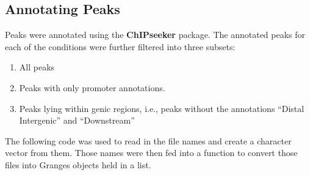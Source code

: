 \documentclass[]{article}
\begin{document}
\subsection{Annotating Peaks}

Peaks were annotated using the \textbf{ChIPseeker} package. The
annotated peaks for each of the conditions were further filtered into
three subsets:

\begin{enumerate}
\def\labelenumi{\arabic{enumi}.}
\item
  All peaks
\item
  Peaks with only promoter annotations.
\item
  Peaks lying within genic regions, i.e., peaks without the annotations
  ``Distal Intergenic'' and ``Downstream''
\end{enumerate}

The following code was used to read in the file names and create a
character vector from them. Those names were then fed into a function to
convert those files into Granges objects held in a list.
\end{document}
